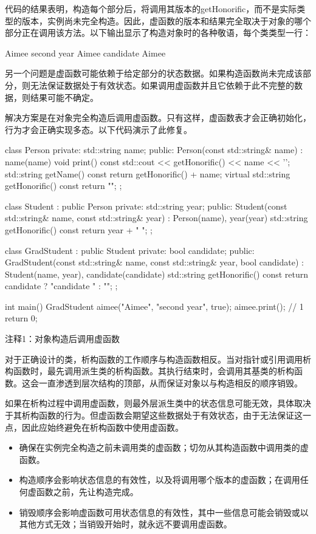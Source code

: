 代码的结果表明，构造每个部分后，将调用其版本的getHonorific，而不是实际类型的版本，实例尚未完全构造。因此，虚函数的版本和结果完全取决于对象的哪个部分正在调用该方法。以下输出显示了构造对象时的各种敬语，每个类类型一行：

\begin{shell}
Aimee
second year Aimee
candidate Aimee
\end{shell}

另一个问题是虚函数可能依赖于给定部分的状态数据。如果构造函数尚未完成该部分，则无法保证数据处于有效状态。如果调用虚函数并且它依赖于此不完整的数据，则结果可能不确定。


解决方案是在对象完全构造后调用虚函数。只有这样，虚函数表才会正确初始化，行为才会正确实现多态。以下代码演示了此修复。


\begin{cpp}
class Person {
private:
  std::string name;
public:
  Person(const std::string& name) : name(name) {}
  void print() const { std::cout << getHonorific() << name << '\n'; }
  std::string getName() const { return getHonorific() + name; }
  virtual std::string getHonorific() const { return ""; }
};

class Student : public Person {
private:
  std::string year;
public:
  Student(const std::string& name, const std::string& year) : Person(name), year(year) {}
  std::string getHonorific() const { return year + " "; }
};

class GradStudent : public Student {
private:
  bool candidate;
public:
  GradStudent(const std::string& name, const std::string& year,
      bool candidate) :
    Student(name, year), candidate(candidate) {}
  std::string getHonorific() const { return candidate ? "candidate " : ""; }
};

int main() {
  GradStudent aimee("Aimee", "second year", true);
  aimee.print(); // 1
  return 0;
}
\end{cpp}

{\footnotesize
注释1：对象构造后调用虚函数
}

对于正确设计的类，析构函数的工作顺序与构造函数相反。当对指针或引用调用析构函数时，最先调用派生类的析构函数。其执行结束时，会调用其基类的析构函数。这会一直渗透到层次结构的顶部，从而保证对象以与构造相反的顺序销毁。

如果在析构过程中调用虚函数，则最外层派生类中的状态信息可能无效，具体取决于其析构函数的行为。但虚函数会期望这些数据处于有效状态，由于无法保证这一点，因此应始终避免在析构函数中使用虚函数。


\begin{itemize}
\item
确保在实例完全构造之前未调用类的虚函数；切勿从其构造函数中调用类的虚函数。

\item
构造顺序会影响状态信息的有效性，以及将调用哪个版本的虚函数；在调用任何虚函数之前，先让构造完成。

\item
销毁顺序会影响虚函数可用状态信息的有效性，其中一些信息可能会销毁或以其他方式无效；当销毁开始时，就永远不要调用虚函数。
\end{itemize}


